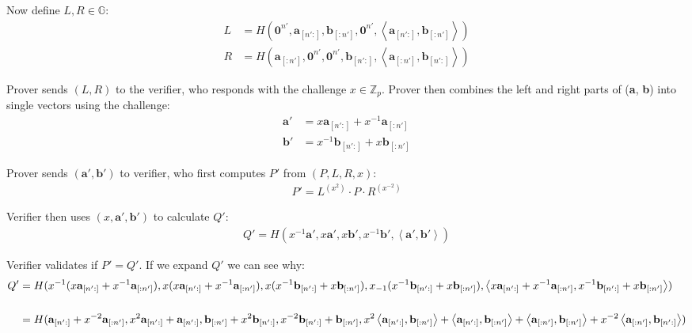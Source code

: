 \documentclass{article}
\begin{document}
Now define $L, R \in \mathbb{G}$:
\begin{align}
  L &= H(\textbf{0}^{n'}, \textbf{a}_{[n':]}, \textbf{b}_{[:n']}, \textbf{0}^{n'}, \left<\textbf{a}_{[n':]}, \textbf{b}_{[:n']}\right>)\\
  R &= H(\textbf{a}_{[:n']}, \textbf{0}^{n'}, \textbf{0}^{n'}, \textbf{b}_{[n':]}, \left<\textbf{a}_{[:n']}, \textbf{b}_{[n':]}\right>)
\end{align}

Prover sends $(L, R)$ to the verifier, who responds with the challenge $x \in \mathbb{Z}_p$.  Prover then combines the left and right parts of (\textbf{a}, \textbf{b}) into single vectors using the challenge:
\begin{align}
  \textbf{a}' &= x \textbf{a}_{[n':]} + x^{-1} \textbf{a}_{[:n']}\\
  \textbf{b}' &= x^{-1} \textbf{b}_{[n':]} + x \textbf{b}_{[:n']}
\end{align}

Prover sends $(\textbf{a}', \textbf{b}')$ to verifier, who first computes $P'$ from $(P, L, R, x)$:
\begin{align}
  P' = L^{(x^2)} \cdot P \cdot R^{(x^{-2})}
\end{align}

Verifier then uses $(x, \textbf{a}', \textbf{b}')$ to calculate $Q'$:
\begin{align}
  Q' = H(x^{-1} \textbf{a}', x \textbf{a}', x \textbf{b}', x^{-1} \textbf{b}', \left<\textbf{a}', \textbf{b}'\right>)
\end{align}

Verifier validates if $P' = Q'$.  If we expand $Q'$ we can see why:
\begin{align}
  Q' &= H(x^{-1}(x \textbf{a}_{[n':]} + x^{-1} \textbf{a}_{[:n']}), x(x \textbf{a}_{[n':]} + x^{-1} \textbf{a}_{[:n']}), x(x^{-1} \textbf{b}_{[n':]} + x \textbf{b}_{[:n']}), x_{-1}(x^{-1} \textbf{b}_{[n':]} + x \textbf{b}_{[:n']}), \left<x \textbf{a}_{[n':]} + x^{-1} \textbf{a}_{[:n']}, x^{-1} \textbf{b}_{[n':]} + x \textbf{b}_{[:n']}\right>)\\
  \cr &= H(\textbf{a}_{[n':]} + x^{-2} \textbf{a}_{[:n']}, x^2 \textbf{a}_{[n':]} + \textbf{a}_{[n':]}, \textbf{b}_{[:n']} + x^2 \textbf{b}_{[n':]}, x^{-2} \textbf{b}_{[n':]} + \textbf{b}_{[:n']}, x^2 \left<\textbf{a}_{[n':]}, \textbf{b}_{[:n']}\right> + \left<\textbf{a}_{[n':]}, \textbf{b}_{[:n']}\right> + \left<\textbf{a}_{[:n']}, \textbf{b}_{[:n']}\right> + x^{-2} \left<\textbf{a}_{[:n']}, \textbf{b}_{[n':]}\right>)
\end{align}
\end{document}
